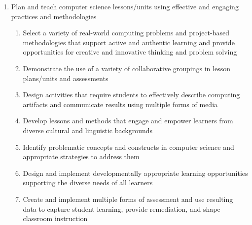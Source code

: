 \begin{enumerate}
\begin{enumerate}
		\item Plan and teach computer science lessons/units using effective and engaging practices and methodologies 				\begin{enumerate}	
			\item Select a variety of real-world computing problems and project-based methodologies that support active and authentic learning and provide opportunities for creative and innovative thinking and problem solving 
			\item Demonstrate the use of a variety of collaborative groupings in lesson plans/units and assessments 					\item Design activities that require students to effectively describe computing artifacts and communicate results using multiple forms of media 				
			\item Develop lessons and methods that engage and empower learners from diverse cultural and linguistic backgrounds 				
			\item Identify problematic concepts and constructs in computer science and appropriate strategies to address them 				
			\item Design and implement developmentally appropriate learning opportunities supporting the diverse needs of all learners 				
			\item Create and implement multiple forms of assessment and use resulting data to capture student learning, provide remediation, and shape classroom instruction
		\end{enumerate}	
	\end{enumerate}
	

\end{enumerate}

